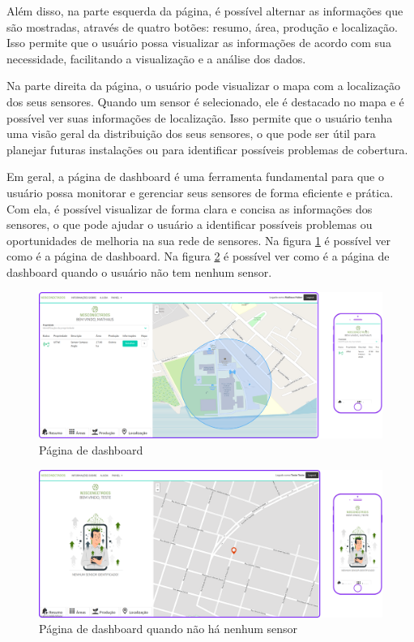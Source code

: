 \documentclass[tcc,capa]{texufpel}
\begin{document}
Além disso, na parte esquerda da página, é possível alternar as informações que são mostradas, através de quatro botões: resumo, área, produção e localização. Isso permite que o usuário possa visualizar as informações de acordo com sua necessidade, facilitando a visualização e a análise dos dados.

Na parte direita da página, o usuário pode visualizar o mapa com a localização dos seus sensores. Quando um sensor é selecionado, ele é destacado no mapa e é possível ver suas informações de localização. Isso permite que o usuário tenha uma visão geral da distribuição dos seus sensores, o que pode ser útil para planejar futuras instalações ou para identificar possíveis problemas de cobertura.

Em geral, a página de dashboard é uma ferramenta fundamental para que o usuário possa monitorar e gerenciar seus sensores de forma eficiente e prática. Com ela, é possível visualizar de forma clara e concisa as informações dos sensores, o que pode ajudar o usuário a identificar possíveis problemas ou oportunidades de melhoria na sua rede de sensores. Na figura \ref{dashboard} é possível ver como é a página de dashboard. Na figura \ref{dashboardnull} é possível ver como é a página de dashboard quando o usuário não tem nenhum sensor.
\begin{figure}[htbp]
  \centering \includegraphics[scale=.2]{assets/dashboard.png}
  \caption{Página de dashboard}
  \label{dashboard}
\end{figure}

\begin{figure}[htbp]
  \centering \includegraphics[scale=.2]{assets/dashboardnull.png}
  \caption{Página de dashboard quando não há nenhum sensor}
  \label{dashboardnull}
\end{figure}
\newpage
\end{document}
